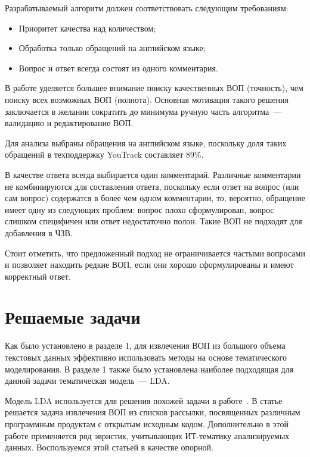 Разрабатываемый алгоритм должен соответствовать следующим требованиям:

\begin{itemize}
\item Приоритет качества над количеством;
\item Обработка только обращений на английском языке;
\item Вопрос и ответ всегда состоят из одного комментария.
\end{itemize}

В работе уделяется большее внимание поиску качественных ВОП (точность), чем поиску всех возможных ВОП (полнота). Основная мотивация такого решения заключается в желании сократить до минимума ручную часть алгоритма~--- валидацию и редактирование ВОП.

Для анализа выбраны обращения на английском языке, поскольку доля таких обращений в техподдержку YouTrack составляет 89\%. 

В качестве ответа всегда выбирается один комментарий. Различные комментарии не комбинируются для составления ответа, поскольку если ответ на вопрос (или сам вопрос) содержатся в более чем одном комментарии, то, вероятно, обращение имеет одну из следующих проблем: вопрос плохо сформулирован, вопрос слишком специфичен или ответ недостаточно полон. Такие ВОП не подходят для добавления в ЧЗВ.

Стоит отметить, что предложенный подход не ограничивается частыми вопросами и позволяет находить редкие ВОП, если они хорошо сформулированы и имеют корректный ответ.

\section{Решаемые задачи}
\label{sec:tasks}

Как было установлено в разделе 1, для извлечения ВОП из большого объема текстовых данных эффективно использовать методы на основе тематического моделирования. В разделе 1 также было установлена наиболее подходящая для данной задачи тематическая модель~--- LDA.

Модель LDA используется для решения похожей задачи в работе~\cite{original}. В статье~\cite{original} решается задача извлечения ВОП из списков рассылки, посвященных различным программным продуктам с открытым исходным кодом. Дополнительно в этой работе применяется ряд эвристик, учитывающих ИТ-тематику анализируемых данных. Воспользуемся этой статьей в качестве опорной.


